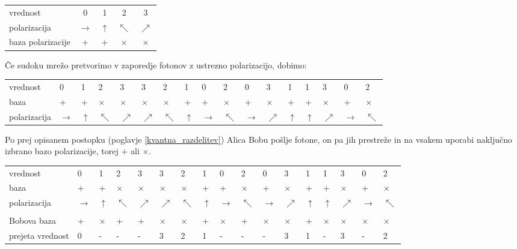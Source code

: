 \documentclass[A4paper, 11pt]{article}
\begin{document}
\begin{center}
\begin{tabular}{l c c c c}
vrednost & 0 & 1 & 2 & 3\\
polarizacija & $\rightarrow$ & $\uparrow$ & $\nwarrow$ & $\nearrow$\\
baza polarizacije & + & + & $\times$ & $\times$\\
\end{tabular}
\end{center}

Če sudoku mrežo pretvorimo v zaporedje fotonov z ustrezno polarizacijo, dobimo:

\begin{center}
\begin{tabular}{l m{0.2 cm} m{0.2 cm} m{0.2 cm} m{0.2 cm} m{0.2 cm} m{0.2 cm} m{0.2 cm} m{0.2 cm} m{0.2 cm} m{0.2 cm} m{0.2 cm} m{0.2 cm} m{0.2 cm} m{0.2 cm} m{0.2 cm} m{0.2 cm}}
vrednost & 0 & 1 & 2 & 3 & 3 & 2 & 1 & 0 & 2 & 0 & 3 & 1 & 1 & 3 & 0 & 2\\
baza & + & + & $\times$ & $\times$ & $\times$ & $\times$ & + & + & $\times$ & + & $\times$ & + & + & $\times$ & + & $\times$\\
polarizacija & $\rightarrow$ & $\uparrow$ & $\nwarrow$ & $\nearrow$ & $\nearrow$ & $\nwarrow$ & $\uparrow$ & $\rightarrow$ & $\nwarrow$ & $\rightarrow$ & $\nearrow$ & $\uparrow$ & $\uparrow$ & $\nearrow$ & $\rightarrow$ & $\nwarrow$
\end{tabular}
\end{center}

Po prej opisanem postopku (poglavje \ref{kvantna_razdelitev}) Alica Bobu pošlje fotone, on pa jih prestreže in na vsakem uporabi naključno izbrano bazo polarizacije, torej $+$ ali $\times$. 

\begin{center}
\begin{tabular}{l m{0.2 cm} m{0.2 cm} m{0.2 cm} m{0.2 cm} m{0.2 cm} m{0.2 cm} m{0.2 cm} m{0.2 cm} m{0.2 cm} m{0.2 cm} m{0.2 cm} m{0.2 cm} m{0.2 cm} m{0.2 cm} m{0.2 cm} m{0.2 cm}}
vrednost & 0 & 1 & 2 & 3 & 3 & 2 & 1 & 0 & 2 & 0 & 3 & 1 & 1 & 3 & 0 & 2\\
baza & + & + & $\times$ & $\times$ & $\times$ & $\times$ & + & + & $\times$ & + & $\times$ & + & + & $\times$ & + & $\times$\\
polarizacija & $\rightarrow$ & $\uparrow$ & $\nwarrow$ & $\nearrow$ & $\nearrow$ & $\nwarrow$ & $\uparrow$ & $\rightarrow$ & $\nwarrow$ & $\rightarrow$ & $\nearrow$ & $\uparrow$ & $\uparrow$ & $\nearrow$ & $\rightarrow$ & $\nwarrow$\\
\\
Bobova baza & + & $\times$ & + & + & $\times$ & $\times$ & + & $\times$ & + & $\times$ & $\times$ & + & $\times$ & $\times$ & $\times$ & $\times$\\
prejeta vrednost & 0 & - & - & - & 3 & 2 & 1 & - & - & - & 3 & 1 & - & 3 & - & 2\\ 
\end{tabular}
\end{center}
\end{document}

